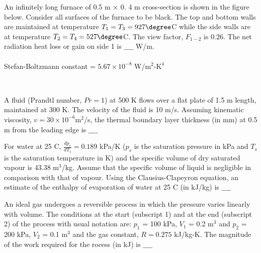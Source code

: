\iffalse
\chapter{2016}
\author{AI24BTECH11009}
\section{me}
\fi

\item An infinitely long furnace of 0.5 m $\times$ 0. 4 m cross-section is shown in the figure below. Consider all surfaces of the furnace to be black. The top and bottom walls are maintained at temperature $T_1 = T_3 = 927\degree $C while the side walls are at temperature $T_2 = T_4 = 527\degree$C. The view factor, $F_{1-2}$ is 0.26. The net radiation heat loss or gain on side 1 is $\_\_\_\_$ W/m. \\\\
Stefan-Boltzmann constant = $5.67 \times 10^{-8}$ W/$\text{m}^2$-$\text{K}^4$
\begin{figure}[!ht]
\centering
\resizebox{0.5\textwidth}{!}{%

}%
\end{figure} \\
\item A fluid (Prandtl number, $Pr = 1$) at 500 K flows over a flat plate of 1.5 m length, maintained at 300 K. The velocity of the fluid is 10 m/s. Assuming kinematic viscosity, $v = 30 \times 10^{-6} \text{m}^2$/s, the
thermal boundary layer thickness (in mm) at 0.5 m from the leading edge is $\_\_\_\_$ \\
\item For water at 25 \degree C, $\frac{dp_s}{dT_s} = 0.189$ kPa/K ($p_s$ is the saturation pressure in kPa and $T_s$ is the saturation temperature in K) and the specific volume of dry saturated vapour is 43.38 $\text{m}^3$/kg. Assume that the specific volume of liquid is negligible in comparison with that of vapour. Using the Clausius-Clapeyron equation, an estimate of the enthalpy of evaporation of water at 25 \degree C (in kJ/kg) is $\_\_\_\_$ \\
\item An ideal gas undergoes a reversible process in which the pressure varies linearly with volume. The conditions at the start (subscript 1) and at the end (subscript 2) of the process with usual notation are: $p_1$ = 100 kPa, $V_1$ = 0.2 $\text{m}^3$ and $p_2$ = 200 kPa, $V_2$ = 0.1 $\text{m}^3$ and the gas constant, $R = 0.275$ kJ/kg-K. The magnitude of the work required for the rocess (in kJ) is $\_\_\_\_$ \\
